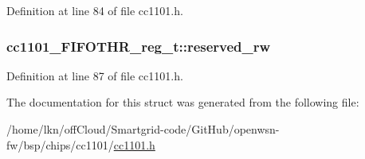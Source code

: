 Definition at line 84 of file cc1101.\+h.

\subsubsection[{\texorpdfstring{reserved\+\_\+rw}{reserved_rw}}]{ cc1101\+\_\+\+F\+I\+F\+O\+T\+H\+R\+\_\+reg\+\_\+t\+::reserved\+\_\+rw}\hypertarget{structcc1101___f_i_f_o_t_h_r__reg__t_a83a5faeff51aa0e5bd2eb51fa8d0cacd}{}\label{structcc1101___f_i_f_o_t_h_r__reg__t_a83a5faeff51aa0e5bd2eb51fa8d0cacd}


Definition at line 87 of file cc1101.\+h.



The documentation for this struct was generated from the following file\+:\begin{DoxyCompactItemize}
\item 
/home/lkn/off\+Cloud/\+Smartgrid-\/code/\+Git\+Hub/openwsn-\/fw/bsp/chips/cc1101/\hyperlink{cc1101_8h}{cc1101.\+h}\end{DoxyCompactItemize}

